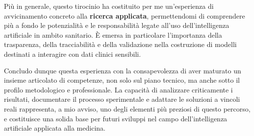 Più in generale, questo tirocinio ha costituito per me un’esperienza di avvicinamento concreto alla \textbf{ricerca applicata}, permettendomi di comprendere più a fondo le potenzialità e le responsabilità legate all’uso dell’intelligenza artificiale in ambito sanitario. È emersa in particolare l’importanza della trasparenza, della tracciabilità e della validazione nella costruzione di modelli destinati a interagire con dati clinici sensibili.

Concludo dunque questa esperienza con la consapevolezza di aver maturato un insieme articolato di competenze, non solo sul piano tecnico, ma anche sotto il profilo metodologico e professionale. La capacità di analizzare criticamente i risultati, documentare il processo sperimentale e adattare le soluzioni a vincoli reali rappresenta, a mio avviso, uno degli elementi più preziosi di questo percorso, e costituisce una solida base per futuri sviluppi nel campo dell’intelligenza artificiale applicata alla medicina.
